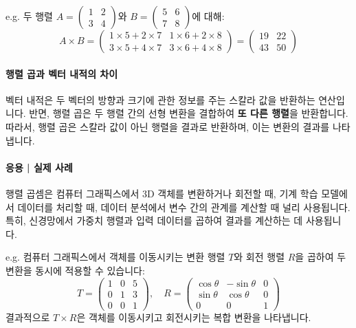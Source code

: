\vspace{1\baselineskip}
\noindent {} e.g. 두 행렬 \(A = \begin{pmatrix} 1 & 2 \\ 3 & 4 \end{pmatrix}\)와 \(B = \begin{pmatrix} 5 & 6 \\ 7 & 8 \end{pmatrix}\)에 대해:
\[
  A \times B = \begin{pmatrix} 1 \times 5 + 2 \times 7 & 1 \times 6 + 2 \times 8 \\ 3 \times 5 + 4 \times 7 & 3 \times 6 + 4 \times 8 \end{pmatrix} = \begin{pmatrix} 19 & 22 \\ 43 & 50 \end{pmatrix}
\]

\paragraph{행렬 곱과 벡터 내적의 차이}
벡터 내적은 두 벡터의 방향과 크기에 관한 정보를 주는 스칼라 값을 반환하는 연산입니다. 반면, 행렬 곱은 두 행렬 간의 선형 변환을 결합하여 \textbf{또 다른 행렬}을 반환합니다. 따라서, 행렬 곱은 스칼라 값이 아닌 행렬을 결과로 반환하며, 이는 변환의 결과를 나타냅니다.

\paragraph{응용 | 실제 사례}
행렬 곱셈은 컴퓨터 그래픽스에서 3D 객체를 변환하거나 회전할 때, 기계 학습 모델에서 데이터를 처리할 때, 데이터 분석에서 변수 간의 관계를 계산할 때 널리 사용됩니다. 특히, 신경망에서 가중치 행렬과 입력 데이터를 곱하여 결과를 계산하는 데 사용됩니다.

\vspace{1\baselineskip}
\noindent {} e.g.
컴퓨터 그래픽스에서 객체를 이동시키는 변환 행렬 \(T\)와 회전 행렬 \(R\)을 곱하여 두 변환을 동시에 적용할 수 있습니다:
\[
  T = \begin{pmatrix} 1 & 0 & 5 \\ 0 & 1 & 3 \\ 0 & 0 & 1 \end{pmatrix}, \quad R = \begin{pmatrix} \cos{\theta} & -\sin{\theta} & 0 \\ \sin{\theta} & \cos{\theta} & 0 \\ 0 & 0 & 1 \end{pmatrix}
\]
결과적으로 \(T \times R\)은 객체를 이동시키고 회전시키는 복합 변환을 나타냅니다.


